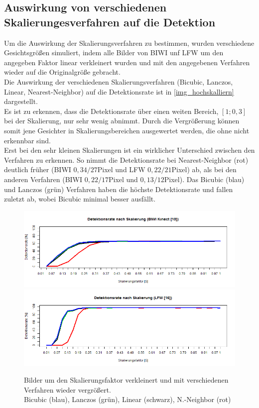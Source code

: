 \subsection{Auswirkung von verschiedenen Skalierungesverfahren auf die Detektion}
\label{OpenFace_skal}
Um die Auswirkung der Skalierungsverfahren zu bestimmen, wurden verschiedene Gesichtsgrößen simuliert, indem alle Bilder von BIWI unf LFW um den angegeben Faktor linear verkleinert wurden und mit den angegebenen Verfahren wieder auf die Originalgröße gebracht.\\
Die Auswirkung der verschiedenen Skalierungsverfahren (Bicubic, Lanczos, Linear, Nearest-Neighbor) auf die Detektionsrate ist in \autoref{img_hochskalliern} dargestellt.\\
Es ist zu erkennen, dass die Detektionsrate über einen weiten Bereich, $[1;0,3]$ bei der Skalierung, nur sehr wenig abnimmt. Durch die Vergrößerung können somit jene Gesichter in Skalierungsbereichen ausgewertet werden, die ohne nicht erkennbar sind.\\
Erst bei den sehr kleinen Skalierungen ist ein wirklicher Unterschied zwischen den Verfahren zu erkennen. So nimmt die Detektionsrate bei  Nearest-Neighbor (rot) deutlich früher (BIWI $0,34/27$Pixel und LFW $0,22/21$Pixel) ab, als bei den anderen Verfahren (BIWI $0,22/17$Pixel und $0,13/12$Pixel). Das Bicubic (blau) und Lanczos (grün) Verfahren haben die höchste Detektionsrate und fallen zuletzt ab, wobei Bicubic minimal besser ausfällt.
\begin{figure}[p]
	\centering
	\includegraphics[width=\linewidth]{img_Skalierung/Resize_Rate_Ges}\\
	\includegraphics[width=\linewidth]{img_Skalierung/Resize_Rate_lfw}
	\caption{Bilder um den Skalierungsfaktor verkleinert und mit verschiedenen Verfahren wieder vergrößert.\\
		Bicubic (blau), Lanczos (grün), Linear (schwarz), N.-Neighbor (rot)}
	\label{img_hochskalliern}
\end{figure}
